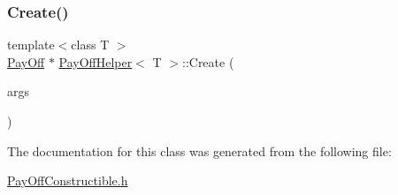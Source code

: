 \subsubsection{\texorpdfstring{Create()}{Create()}}
{\footnotesize\ttfamily template$<$class T $>$ \\
\hyperlink{classPayOff}{Pay\+Off} $\ast$ \hyperlink{classPayOffHelper}{Pay\+Off\+Helper}$<$ T $>$\+::Create (\begin{DoxyParamCaption}\item[{const \hyperlink{classMJArray}{M\+J\+Array} \&}]{args }\end{DoxyParamCaption})\hspace{0.3cm}{\ttfamily [static]}}



The documentation for this class was generated from the following file\+:\begin{DoxyCompactItemize}
\item 
\hyperlink{PayOffConstructible_8h}{Pay\+Off\+Constructible.\+h}\end{DoxyCompactItemize}
